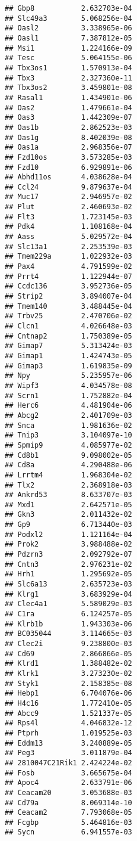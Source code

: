 \documentclass[
]{article}
\begin{document}
\begin{verbatim}
## Gbp8           2.632703e-04
## Slc49a3        5.068256e-04
## Oasl2          3.338965e-06
## Oasl1          7.387812e-05
## Msi1           1.224166e-09
## Tesc           5.064155e-06
## Tbx3os1        1.570913e-04
## Tbx3           2.327360e-11
## Tbx3os2        3.459801e-08
## Rasal1         1.434901e-06
## Oas2           1.479661e-04
## Oas3           1.442309e-07
## Oas1b          2.862523e-03
## Oas1g          8.402039e-08
## Oas1a          2.968356e-07
## Fzd10os        3.573285e-03
## Fzd10          6.929891e-06
## Abhd11os       4.038628e-04
## Ccl24          9.879637e-04
## Muc17          2.946957e-02
## Plut           2.460693e-02
## Flt3           1.723145e-03
## Pdk4           1.108168e-04
## Aass           5.029572e-04
## Slc13a1        2.253539e-03
## Tmem229a       1.022932e-03
## Pax4           4.791599e-02
## Prrt4          1.122944e-07
## Ccdc136        3.952736e-05
## Strip2         3.894007e-04
## Tmem140        3.488445e-04
## Trbv25         2.470706e-02
## Clcn1          4.026648e-03
## Cntnap2        1.750389e-05
## Gimap7         5.313424e-03
## Gimap1         1.424743e-05
## Gimap3         1.619835e-09
## Npy            5.235957e-06
## Wipf3          4.034578e-08
## Scrn1          1.752882e-04
## Herc6          4.481904e-06
## Abcg2          2.401709e-03
## Snca           1.981636e-02
## Tnip3          3.104097e-10
## Spmip9         4.085977e-02
## Cd8b1          9.098002e-05
## Cd8a           4.290488e-06
## Lrrtm4         1.968304e-02
## Tlx2           2.368918e-03
## Ankrd53        8.633707e-03
## Mxd1           2.642571e-05
## Gkn3           2.011432e-02
## Gp9            6.713440e-03
## Podxl2         1.121164e-04
## Prok2          3.988488e-02
## Pdzrn3         2.092792e-07
## Cntn3          2.976231e-02
## Hrh1           1.295692e-05
## Slc6a13        2.635723e-03
## Klrg1          3.683929e-04
## Clec4a1        5.589029e-03
## C1ra           6.124257e-05
## Klrb1b         1.943303e-06
## BC035044       3.114665e-03
## Clec2i         9.238800e-03
## Cd69           2.866866e-05
## Klrd1          1.388482e-02
## Klrk1          3.273230e-02
## Styk1          2.158385e-08
## Hebp1          6.704076e-06
## H4c16          1.772410e-05
## Abcc9          1.521337e-05
## Rps4l          4.046832e-12
## Ptprh          1.019525e-03
## Eddm13         3.240889e-05
## Peg3           3.011879e-04
## 2810047C21Rik1 2.424224e-02
## Fosb           3.665675e-04
## Apoc4          2.633791e-06
## Ceacam20       3.053688e-03
## Cd79a          8.069314e-10
## Ceacam2        7.793068e-05
## Fcgbp          5.464816e-03
## Sycn           6.941557e-03

\end{verbatim}
\end{document}
